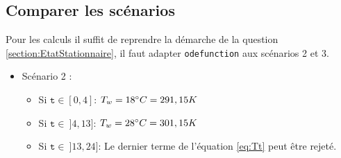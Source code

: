 \documentclass[12pt]{article}
\begin{document}
    \subsection{Comparer les scénarios}
        Pour les calculs il suffit de reprendre la démarche de la question \ref{section:EtatStationnaire}, il faut adapter \texttt{odefunction} aux scénarios 2 et 3. \begin{itemize}
            \item Scénario 2 : 
                    \begin{itemize}
                        \item Si $\texttt{t} \in [0,4]$: $T_w = 18\degree C = 291,15 K$
                        \item Si $\texttt{t} \in \: ]4,13]$: $T_w = 28\degree C = 301,15 K$
                        \item Si $\texttt{t} \in \: ]13, 24]$: Le dernier terme de l'équation \ref{eq:Tt} peut être rejeté.

                    \end{itemize}
        \end{itemize}
        
        


        
\newpage

\end{document}
